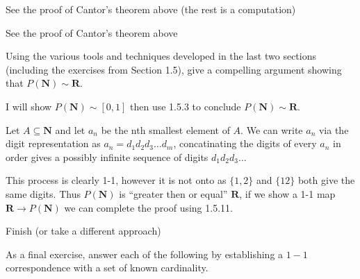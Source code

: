 \begin{exercise}
  See the proof of Cantor's theorem above (the rest is a computation)
\end{exercise}

\begin{exercise}
  See the proof of Cantor's theorem above
\end{exercise}

\begin{exercise}
  Using the various tools and techniques developed in the last two sections (including the exercises from Section 1.5), give a compelling argument showing that $P(\mathbf{N}) \sim \mathbf{R}$.
\end{exercise}

\begin{solution}
  I will show $P(\mathbf N) \sim [0, 1]$ then use 1.5.3 to conclude $P(\mathbf N) \sim \mathbf R$.

  Let $A \subseteq \mathbf N$ and let $a_n$ be the nth smallest element of $A$.
  We can write $a_n$ via the digit representation as $a_n = d_1d_2d_3\dots d_m$, concatinating the digits of every $a_n$ in order gives a possibly infinite sequence of digits $d_1d_2d_3\dots$

  This process is clearly 1-1, however it is not onto as $\{1, 2\}$ and $\{12\}$ both give the same digits. Thus $P(\mathbf N)$ is ``greater then or equal'' $\mathbf{R}$, if we show a 1-1 map $\mathbf R \to P(\mathbf{N})$ we can complete the proof using 1.5.11.

  \TODO Finish (or take a different approach)
\end{solution}

\begin{exercise}
  As a final exercise, answer each of the following by establishing a $1-1$ correspondence with a set of known cardinality.
\end{exercise}

